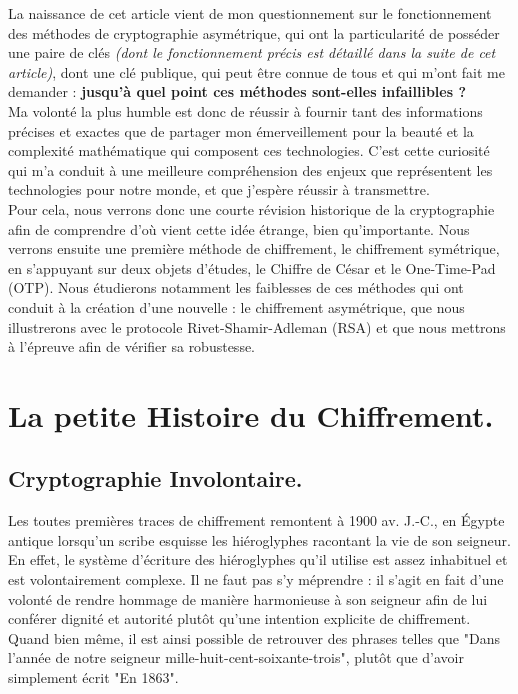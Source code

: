 \documentclass{article}
\begin{document}
La naissance de cet article vient de mon questionnement sur le fonctionnement des méthodes de cryptographie asymétrique, qui ont la particularité de posséder une paire de clés \textit{(dont le fonctionnement précis est détaillé dans la suite de cet article)}, dont une clé publique, qui peut être connue de tous et qui m'ont fait me demander : \textbf{jusqu'à quel point ces méthodes sont-elles infaillibles ?} \\

Ma volonté la plus humble est donc de réussir à fournir tant des informations précises et exactes que de partager mon émerveillement pour la beauté et la complexité mathématique qui composent ces technologies. C'est cette curiosité qui m'a conduit à une meilleure compréhension des enjeux que représentent les technologies pour notre monde, et que j'espère réussir à transmettre.  \\

Pour cela, nous verrons donc une courte révision historique de la cryptographie afin de comprendre d'où vient cette idée étrange, bien qu'importante. Nous verrons ensuite une première méthode de chiffrement, le chiffrement symétrique, en s'appuyant sur deux objets d'études, le Chiffre de César et le One-Time-Pad (OTP). Nous étudierons notamment les faiblesses de ces méthodes qui ont conduit à la création d'une nouvelle : le chiffrement asymétrique, que nous illustrerons avec le protocole Rivet-Shamir-Adleman (RSA) et que nous mettrons à l'épreuve afin de vérifier sa robustesse. 


\section{La petite Histoire du
	Chiffrement.}\label{la-petite-histoire-du-chiffrement.}

\subsection{Cryptographie Involontaire.}\label{egypte.}
Les toutes premières traces de chiffrement remontent à 1900 av. J.-C.,
en Égypte antique lorsqu'un scribe esquisse les hiéroglyphes racontant
la vie de son seigneur. En effet, le système d'écriture des hiéroglyphes
qu'il utilise est assez inhabituel et est volontairement complexe. Il ne faut pas s'y méprendre : il s'agit en fait d'une volonté de rendre hommage de manière
harmonieuse à son seigneur afin de lui conférer dignité et autorité
plutôt qu'une intention explicite de chiffrement. Quand bien même, il est ainsi possible
de retrouver des phrases telles que "Dans l'année de notre seigneur
mille-huit-cent-soixante-trois", plutôt que d'avoir simplement écrit
"En 1863". \\
\end{document}
